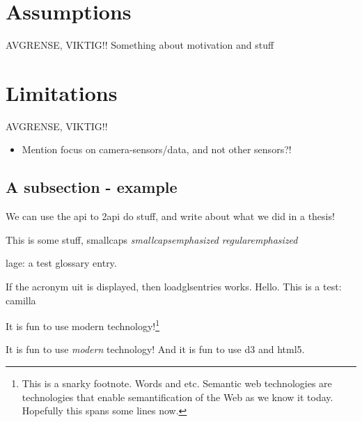\documentclass[USenglish]{uit-thesis}
\begin{document}
\section{Assumptions}
AVGRENSE, VIKTIG!!
Something about motivation and stuff

\section{Limitations}
AVGRENSE, VIKTIG!!

\begin{itemize}
\item Mention focus on camera-sensors/data, and not other sensors?!
\end{itemize}





\iffalse
\subsection{A subsection - example}
We can use the \ac{api} to \ac{2api} do stuff, and write about what we did in a \gls{thesis}!

This is some stuff, {\sc smallcaps {\em smallcapsemphasized}} {\em regularemphasized}

\Gls{lage}: a test glossary entry.

If the acronym \ac{uit} is displayed, then loadglsentries works.
Hello. This is a test: \ac{camilla}

It is fun to use modern  technology!\footnote{This is a snarky footnote. Words and etc. Semantic web technologies are technologies that enable semantification of the Web as we know it today. Hopefully this spans some lines now.}

It is fun to use \emph{modern } technology! And it is fun to use \ac{d3} and \ac{html5}.
\end{document}
